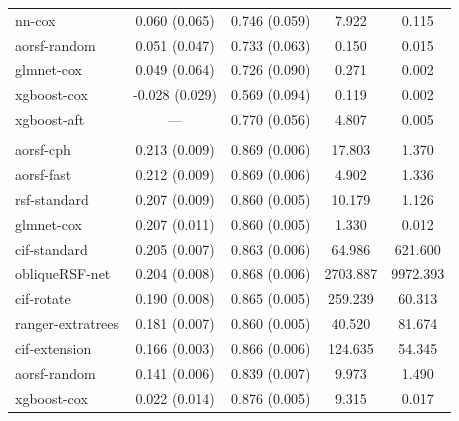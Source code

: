 \documentclass[12pt]{article}\usepackage[]{graphicx}\usepackage[]{xcolor}
\newenvironment{knitrout}{}{} %
\begin{document}
\begin{knitrout}
\begin{longtable}[t]{lcccc}
\hspace{1em}nn-cox & 0.060 (0.065) & 0.746 (0.059) & 7.922 & 0.115\\
\hspace{1em}aorsf-random & 0.051 (0.047) & 0.733 (0.063) & 0.150 & 0.015\\
\hspace{1em}glmnet-cox & 0.049 (0.064) & 0.726 (0.090) & 0.271 & 0.002\\
\hspace{1em}xgboost-cox & -0.028 (0.029) & 0.569 (0.094) & 0.119 & 0.002\\
\hspace{1em}xgboost-aft & --- & 0.770 (0.056) & 4.807 & 0.005\\
\addlinespace[0.3em]
\multicolumn{5}{l}{\textit{\textbf{Non-alcohol fatty liver disease; death, n = 17549, p = 24}}}\\
\hline
\hspace{1em}aorsf-cph & 0.213 (0.009) & 0.869 (0.006) & 17.803 & 1.370\\
\hspace{1em}aorsf-fast & 0.212 (0.009) & 0.869 (0.006) & 4.902 & 1.336\\
\hspace{1em}rsf-standard & 0.207 (0.009) & 0.860 (0.005) & 10.179 & 1.126\\
\hspace{1em}glmnet-cox & 0.207 (0.011) & 0.860 (0.005) & 1.330 & 0.012\\
\hspace{1em}cif-standard & 0.205 (0.007) & 0.863 (0.006) & 64.986 & 621.600\\
\hspace{1em}obliqueRSF-net & 0.204 (0.008) & 0.868 (0.006) & 2703.887 & 9972.393\\
\hspace{1em}cif-rotate & 0.190 (0.008) & 0.865 (0.005) & 259.239 & 60.313\\
\hspace{1em}ranger-extratrees & 0.181 (0.007) & 0.860 (0.005) & 40.520 & 81.674\\
\hspace{1em}cif-extension & 0.166 (0.003) & 0.866 (0.006) & 124.635 & 54.345\\
\hspace{1em}aorsf-random & 0.141 (0.006) & 0.839 (0.007) & 9.973 & 1.490\\
\hspace{1em}xgboost-cox & 0.022 (0.014) & 0.876 (0.005) & 9.315 & 0.017\\

\end{longtable}
\end{knitrout}
\end{document}
